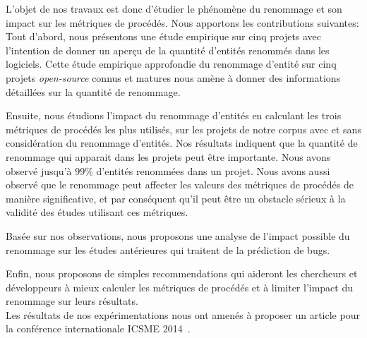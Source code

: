 L'objet de nos travaux est donc d’étudier le phénomène du renommage et son impact sur les métriques de procédés. Nous apportons les contributions suivantes:\\

Tout d'abord, nous présentons une étude empirique sur cinq projets avec l'intention de donner un aperçu de la quantité d'entités renommés dans les logiciels. Cette étude empirique approfondie du renommage d'entité sur cinq projets \textit{open-source} connus et matures nous amène à donner des informations détaillées sur la quantité de renommage.

Ensuite, nous étudions l'impact du renommage d'entités en calculant les trois métriques de procédés les plus utilisés, sur les projets de notre corpus avec et sans considération du renommage d'entités. Nos résultats indiquent que la quantité de renommage qui apparait dans les projets peut être importante. Nous avons observé jusqu'à $99\%$ d'entités renommées dans un projet. Nous avons aussi observé que le renommage peut affecter les valeurs des métriques de procédés de manière significative, et par conséquent qu'il peut être un obstacle sérieux à la validité des études utilisant ces métriques.

Basée sur nos observations, nous proposons une analyse de l'impact possible du renommage sur les études antérieures qui traitent de la prédiction de bugs. 

Enfin, nous proposons de simples recommendations qui aideront les chercheurs et développeurs à mieux calculer les métriques de procédés et à limiter l'impact du renommage sur leurs résultats.\\

Les résultats de nos expérimentations nous ont amenés à proposer un article pour la conférence internationale ICSME 2014~\cite{icsme_2014}.



